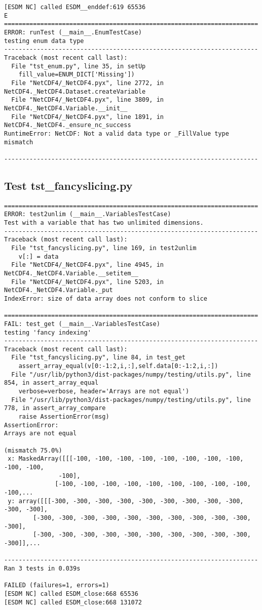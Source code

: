 \begin{verbatim}
[ESDM NC] called ESDM__enddef:619 65536
E
======================================================================
ERROR: runTest (__main__.EnumTestCase)
testing enum data type
----------------------------------------------------------------------
Traceback (most recent call last):
  File "tst_enum.py", line 35, in setUp
    fill_value=ENUM_DICT['Missing'])
  File "NetCDF4/_NetCDF4.pyx", line 2772, in NetCDF4._NetCDF4.Dataset.createVariable
  File "NetCDF4/_NetCDF4.pyx", line 3809, in NetCDF4._NetCDF4.Variable.__init__
  File "NetCDF4/_NetCDF4.pyx", line 1891, in NetCDF4._NetCDF4._ensure_nc_success
RuntimeError: NetCDF: Not a valid data type or _FillValue type mismatch

----------------------------------------------------------------------
\end{verbatim}

\subsection{Test tst\_fancyslicing.py}

\begin{verbatim}
======================================================================
ERROR: test2unlim (__main__.VariablesTestCase)
Test with a variable that has two unlimited dimensions.
----------------------------------------------------------------------
Traceback (most recent call last):
  File "tst_fancyslicing.py", line 169, in test2unlim
    v[:] = data
  File "NetCDF4/_NetCDF4.pyx", line 4945, in NetCDF4._NetCDF4.Variable.__setitem__
  File "NetCDF4/_NetCDF4.pyx", line 5203, in NetCDF4._NetCDF4.Variable._put
IndexError: size of data array does not conform to slice

======================================================================
FAIL: test_get (__main__.VariablesTestCase)
testing 'fancy indexing'
----------------------------------------------------------------------
Traceback (most recent call last):
  File "tst_fancyslicing.py", line 84, in test_get
    assert_array_equal(v[0:-1:2,i,:],self.data[0:-1:2,i,:])
  File "/usr/lib/python3/dist-packages/numpy/testing/utils.py", line 854, in assert_array_equal
    verbose=verbose, header='Arrays are not equal')
  File "/usr/lib/python3/dist-packages/numpy/testing/utils.py", line 778, in assert_array_compare
    raise AssertionError(msg)
AssertionError:
Arrays are not equal

(mismatch 75.0%)
 x: MaskedArray([[[-100, -100, -100, -100, -100, -100, -100, -100, -100, -100,
               -100],
              [-100, -100, -100, -100, -100, -100, -100, -100, -100, -100,...
 y: array([[[-300, -300, -300, -300, -300, -300, -300, -300, -300, -300, -300],
        [-300, -300, -300, -300, -300, -300, -300, -300, -300, -300, -300],
        [-300, -300, -300, -300, -300, -300, -300, -300, -300, -300, -300]],...

----------------------------------------------------------------------
Ran 3 tests in 0.039s

FAILED (failures=1, errors=1)
[ESDM NC] called ESDM_close:668 65536
[ESDM NC] called ESDM_close:668 131072
\end{verbatim}

